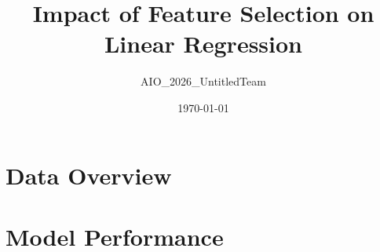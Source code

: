 \documentclass[12pt,a4paper]{article}
\title{Impact of Feature Selection on Linear Regression}
\author{AIO\_2026\_UntitledTeam}
\date{\today}
\begin{document}
\maketitle

\section{Data Overview}

\section{Model Performance}
\end{document}
